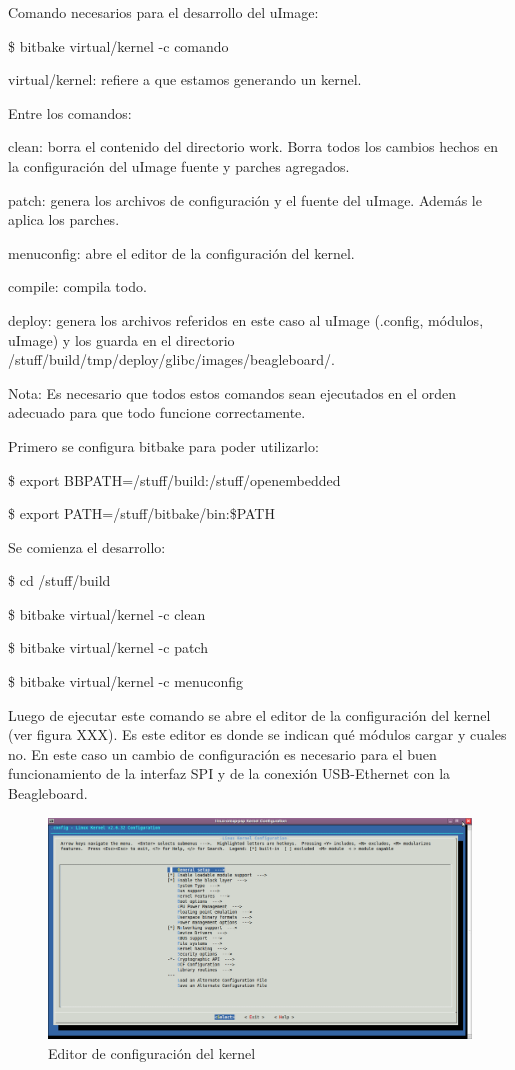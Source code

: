 \bigskip 
Comando necesarios para el desarrollo del uImage:

\bigskip
\centerline{\$ bitbake virtual/kernel -c comando}

\bigskip
virtual/kernel: refiere a que estamos generando un kernel.

\bigskip
Entre los comandos:

\bigskip
clean: borra el contenido del directorio work. Borra todos los cambios hechos en la configuración del uImage fuente y parches agregados.

patch: genera los archivos de configuración y el fuente del uImage. Además le aplica los parches.

menuconfig: abre el editor de la configuración del kernel.

compile: compila todo.

deploy: genera los archivos referidos en este caso al uImage (.config, módulos, uImage) y los guarda en el directorio /stuff/build/tmp/deploy/glibc/images/beagleboard/.

\bigskip
Nota: Es necesario que todos estos comandos sean ejecutados en el orden adecuado para que todo funcione correctamente.

\bigskip
Primero se configura bitbake para poder utilizarlo:

\centerline{\$ export BBPATH=/stuff/build:/stuff/openembedded}

\centerline{\$ export PATH=/stuff/bitbake/bin:\$PATH}

\bigskip
Se comienza el desarrollo:

\centerline{\$ cd /stuff/build}

\centerline{\$ bitbake virtual/kernel -c clean}

\centerline{\$ bitbake virtual/kernel -c patch}

\centerline{\$ bitbake virtual/kernel -c menuconfig}

\bigskip
Luego de ejecutar este comando se abre el editor de la configuración del kernel (ver figura XXX). Es este editor es donde se indican qué módulos cargar y cuales no. En este caso un cambio de  configuración es necesario para el buen funcionamiento de la interfaz SPI y de la conexión USB-Ethernet con la Beagleboard.

\begin{figure}[H]
\centering
  \begin{center}
  \includegraphics[scale=.3]{Imagenes/kernel.png} 
  \end{center}
  \caption{Editor de configuración del kernel}\label{Fig:HW} 
\end{figure}

